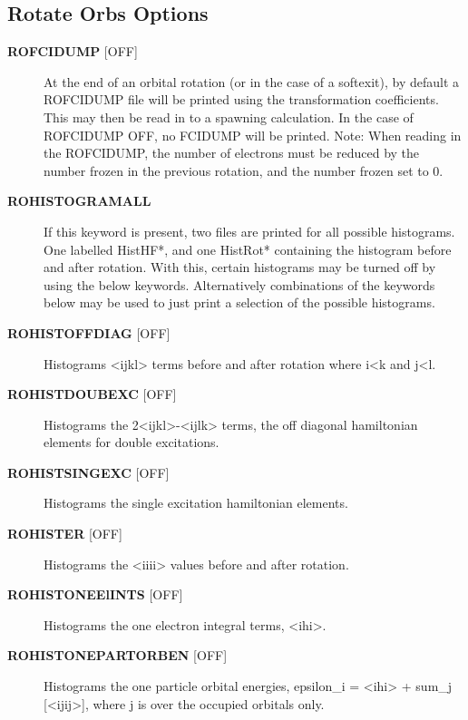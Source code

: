 \documentclass[openany,a4paper,10pt,english]{manual}
\begin{document}
\subsection{Rotate Orbs Options}
\begin{description}
\item[\textbf{ROFCIDUMP} {[}OFF{]}] \leavevmode
At the end of an orbital rotation (or in the case of a softexit), by default
a ROFCIDUMP file will be printed using the transformation coefficients.
This may then be read in to a spawning calculation.
In the case of ROFCIDUMP OFF, no FCIDUMP will be printed.
Note: When reading in the ROFCIDUMP, the number of electrons must be reduced
by the number frozen in the previous rotation, and the number frozen set to 0.

\item[\textbf{ROHISTOGRAMALL}] \leavevmode
If this keyword is present, two files are printed for all possible histograms.
One labelled HistHF*, and one HistRot* containing the histogram before and after rotation.
With this, certain histograms may be turned off by using the below keywords.
Alternatively combinations of the keywords below may be used to just print a selection
of the possible histograms.

\item[\textbf{ROHISTOFFDIAG} {[}OFF{]}] \leavevmode
Histograms \textless{}ij\textbar{}kl\textgreater{} terms before and after rotation where i\textless{}k and j\textless{}l.

\item[\textbf{ROHISTDOUBEXC} {[}OFF{]}] \leavevmode
Histograms the 2\textless{}ij\textbar{}kl\textgreater{}-\textless{}ij\textbar{}lk\textgreater{} terms, the off diagonal hamiltonian elements for double
excitations.

\item[\textbf{ROHISTSINGEXC} {[}OFF{]}] \leavevmode
Histograms the single excitation hamiltonian elements.

\item[\textbf{ROHISTER} {[}OFF{]}] \leavevmode
Histograms the \textless{}ii\textbar{}ii\textgreater{} values before and after rotation.

\item[\textbf{ROHISTONEElINTS} {[}OFF{]}] \leavevmode
Histograms the one electron integral terms, \textless{}i\textbar{}h\textbar{}i\textgreater{}.

\item[\textbf{ROHISTONEPARTORBEN} {[}OFF{]}] \leavevmode
Histograms the one particle orbital energies, epsilon\_i = \textless{}i\textbar{}h\textbar{}i\textgreater{} + sum\_j {[}\textless{}ij\textbar{}\textbar{}ij\textgreater{}{]},
where j is over the occupied orbitals only.


\end{description}
\end{document}

